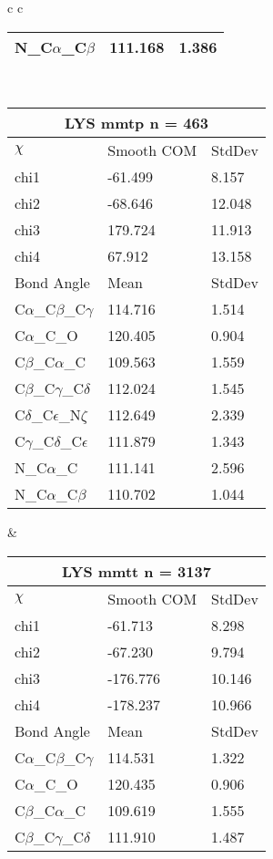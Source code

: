 \begin{longtable}{ c c }
\begin{tabular}{ l l l }
  N\_C$\alpha$\_C$\beta$ & 111.168 & 1.386\\
  \bottomrule
  \end{tabular}
  \\
  \begin{tabular}{ l l l }
  \toprule
  \multicolumn{3}{c}{LYS \textbf{mmtp} n = 463} \\ \toprule
  $\chi$       & Smooth COM & StdDev \\ \midrule
  chi1 & -61.499 & 8.157 \\ 
  chi2 & -68.646 & 12.048 \\ 
  chi3 & 179.724 & 11.913 \\ 
  chi4 & 67.912 & 13.158 \\ \midrule
  Bond Angle   & Mean     & StdDev \\ \midrule
  C$\alpha$\_C$\beta$\_C$\gamma$ & 114.716 & 1.514\\
  C$\alpha$\_C\_O & 120.405 & 0.904\\
  C$\beta$\_C$\alpha$\_C & 109.563 & 1.559\\
  C$\beta$\_C$\gamma$\_C$\delta$ & 112.024 & 1.545\\
  C$\delta$\_C$\epsilon$\_N$\zeta$ & 112.649 & 2.339\\
  C$\gamma$\_C$\delta$\_C$\epsilon$ & 111.879 & 1.343\\
  N\_C$\alpha$\_C & 111.141 & 2.596\\
  N\_C$\alpha$\_C$\beta$ & 110.702 & 1.044\\
  \bottomrule
  \end{tabular}
  &
  \begin{tabular}{ l l l }
  \toprule
  \multicolumn{3}{c}{LYS \textbf{mmtt} n = 3137} \\ \toprule
  $\chi$       & Smooth COM & StdDev \\ \midrule
  chi1 & -61.713 & 8.298 \\ 
  chi2 & -67.230 & 9.794 \\ 
  chi3 & -176.776 & 10.146 \\ 
  chi4 & -178.237 & 10.966 \\ \midrule
  Bond Angle   & Mean     & StdDev \\ \midrule
  C$\alpha$\_C$\beta$\_C$\gamma$ & 114.531 & 1.322\\
  C$\alpha$\_C\_O & 120.435 & 0.906\\
  C$\beta$\_C$\alpha$\_C & 109.619 & 1.555\\
  C$\beta$\_C$\gamma$\_C$\delta$ & 111.910 & 1.487\\

\end{tabular}
\end{longtable}

